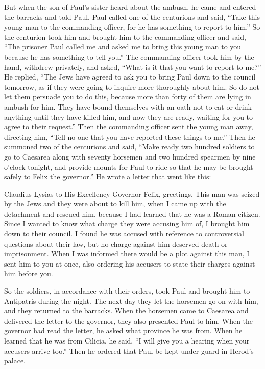 {\par }{\PP {}But
when the son
of Paul’s
sister
heard
about the ambush,
he came
and
entered
the barracks
and told
Paul.
Paul
called
one
of the centurions
and said,
“Take
this
young man
to
the commanding officer,
for
he has
something
to report
to him.”
So
the centurion took
him
and brought
him to
the commanding officer
and
said,
“The prisoner
Paul
called
me
and asked
me to bring
this
young
man to
you
because he has
something to tell you.”
The commanding officer
took
him
by the hand,
withdrew
privately,
and
asked,
“What
is it
that
you want
to report
to me?”
He replied, “The Jews
have agreed
to ask
you
to bring Paul
down
to
the council
tomorrow,
as
if they were going
to inquire
more thoroughly
about
him.
So
do not
let them
persuade
you
to do this, because more than
forty
of
them
are lying in ambush
for him. They have bound
themselves
with an oath
not
to eat
or
drink
anything until
they have killed
him,
and
now
they are
ready,
waiting
for
you to agree to their request.”
Then
the commanding officer
sent
the young man
away,
directing
him, “Tell
no one
that
you have reported
these things
to
me.”
Then
he summoned
two
of the centurions
and said,
“Make ready
two hundred
soldiers
to go
to
Caesarea
along
with seventy
horsemen
and
two hundred
spearmen
by
nine
o’clock
tonight,
and
provide
mounts
for Paul
to ride
so that
he may be brought safely
to
Felix
the governor.”
He wrote
a letter
that went
like
this:
\par }{\PI {}Claudius
Lysias
to His Excellency
Governor
Felix,
greetings.
This
man
was seized
by
the Jews
and
they were about
to kill
him,
when I came up
with
the detachment
and rescued
him, because I had learned
that
he was
a Roman citizen.
Since
I wanted
to know
what charge
they were accusing
him
of, I brought
him down
to
their
council.
I found
he was accused
with
reference to controversial questions
about their
law,
but
no
charge
against him deserved
death
or
imprisonment.
When
I
was informed
there would be
a plot
against
this man,
I sent
him to
you
at once,
also
ordering
his accusers
to state
their charges against
him
before
you.
\par }{\PP {}So
the soldiers,
in accordance with
their
orders,
took
Paul
and brought
him to
Antipatris
during
the night.
The next day
they let
the horsemen
go on
with
him,
and they returned
to
the barracks.
When the horsemen came
to
Caesarea
and
delivered
the letter
to the governor,
they
also
presented
Paul
to him.
When the governor had read
the letter, he asked
what
province
he was
from.
When he learned that
he was from
Cilicia,
he said,
“I will give
you
a hearing
when
your
accusers
arrive
too.” Then he ordered
that Paul
be kept under guard
in
Herod’s
palace.

}

